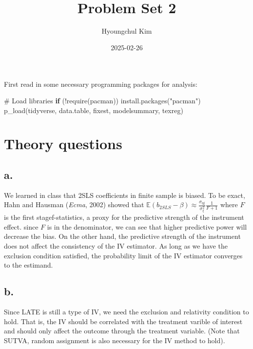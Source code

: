\documentclass[
  letterpaper,
  DIV=11,
  numbers=noendperiod]{scrartcl}
\title{Problem Set 2}
\author{Hyoungchul Kim}
\date{2025-02-26}
\newenvironment{Shaded}{\begin{snugshade}}{\end{snugshade}}
\newcommand{\CommentTok}[1]{\textcolor[rgb]{0.37,0.37,0.37}{#1}}
\newcommand{\ControlFlowTok}[1]{\textcolor[rgb]{0.00,0.23,0.31}{\textbf{#1}}}
\newcommand{\FunctionTok}[1]{\textcolor[rgb]{0.28,0.35,0.67}{#1}}
\newcommand{\NormalTok}[1]{\textcolor[rgb]{0.00,0.23,0.31}{#1}}
\newcommand{\SpecialCharTok}[1]{\textcolor[rgb]{0.37,0.37,0.37}{#1}}
\newcommand{\StringTok}[1]{\textcolor[rgb]{0.13,0.47,0.30}{#1}}
\begin{document}
\maketitle


First read in some necessary programming packages for analysis:

\begin{Shaded}
\begin{Highlighting}[]
\CommentTok{\# Load libraries}
\ControlFlowTok{if}\NormalTok{ (}\SpecialCharTok{!}\FunctionTok{require}\NormalTok{(pacman)) }\FunctionTok{install.packages}\NormalTok{(}\StringTok{"pacman"}\NormalTok{)}
\FunctionTok{p\_load}\NormalTok{(tidyverse, data.table, fixest, modelsummary, texreg)}
\end{Highlighting}
\end{Shaded}

\section{Theory questions}\label{theory-questions}

\subsection{a.}\label{a.}

We learned in class that 2SLS coefficients in finite sample is biased.
To be exact, Hahn and Hausman (\emph{Ecma}, 2002) showed that
\(\mathbb{E}(b_{2SLS} - \beta) \approx \frac{\sigma_{\eta \xi}}{\sigma^2_\xi} \frac{1}{F+1}\)
where \(F\) is the first stagef-statistics, a proxy for the predictive
strength of the instrument effect. since \(F\) is in the denominator, we
can see that higher predictive power will decrease the bias. On the
other hand, the predictive strength of the instrument does not affect
the consistency of the IV estimator. As long as we have the exclusion
condition satisfied, the probability limit of the IV estimator converges
to the estimand.

\subsection{b.}\label{b.}

Since LATE is still a type of IV, we need the exclusion and relativity
condition to hold. That is, the IV should be correlated with the
treatment varible of interest and should only affect the outcome through
the treatment variable. (Note that SUTVA, random assignment is also
necessary for the IV method to hold).
\end{document}

